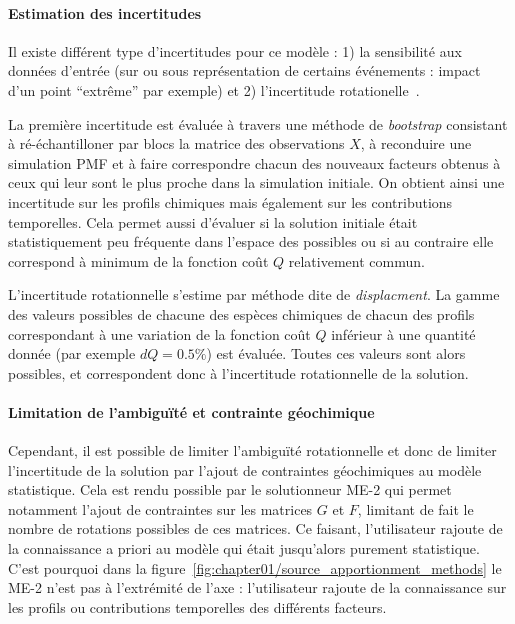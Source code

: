 \paragraph{Estimation des incertitudes}%
\label{par:incertitudes}

Il existe différent type d'incertitudes pour ce modèle : 1) la sensibilité aux données
d'entrée (sur ou sous représentation de certains événements : impact d'un point
``extrême'' par exemple) et 2) l'incertitude rotationelle~\autocite{brownMethods2015}.

La première incertitude est évaluée à travers une méthode de \textit{bootstrap} consistant
à ré-échantilloner par blocs la matrice des observations $X$, à reconduire une simulation
PMF et à faire correspondre chacun des nouveaux facteurs obtenus à ceux qui leur sont le
plus proche dans la simulation initiale.
On obtient ainsi une incertitude sur les profils chimiques mais également sur les
contributions temporelles.
Cela permet aussi d'évaluer si la solution initiale était statistiquement peu fréquente
dans l'espace des possibles ou si au contraire elle correspond à minimum de la fonction
coût $Q$ relativement commun.

L'incertitude rotationnelle s'estime par méthode dite de \textit{displacment}. La gamme des
valeurs possibles de chacune des espèces chimiques de chacun des profils correspondant à
une variation de la fonction coût $Q$ inférieur à une quantité donnée (par exemple $dQ =
0.5\%$) est évaluée. Toutes ces valeurs sont alors possibles, et correspondent donc à
l'incertitude rotationnelle de la solution.

\paragraph{Limitation de l'ambiguïté et contrainte géochimique}%
\label{par:limitation_de_l_ambiguité_et_contrainte_géochimique}

Cependant, il est possible de limiter l'ambiguïté rotationnelle et donc de limiter
l'incertitude de la solution par l'ajout de contraintes géochimiques au modèle statistique.
Cela est rendu possible par le solutionneur ME-2 qui permet notamment l'ajout de contraintes
sur les matrices $G$ et $F$, limitant de fait le nombre de rotations possibles de ces
matrices. Ce faisant, l'utilisateur rajoute de la connaissance a priori au modèle qui
était jusqu'alors purement statistique. C'est pourquoi dans la
figure~\ref{fig:chapter01/source_apportionment_methods} le ME-2 n'est pas à l'extrémité de
l'axe : l'utilisateur rajoute de la connaissance sur les profils ou contributions
temporelles des différents facteurs.

